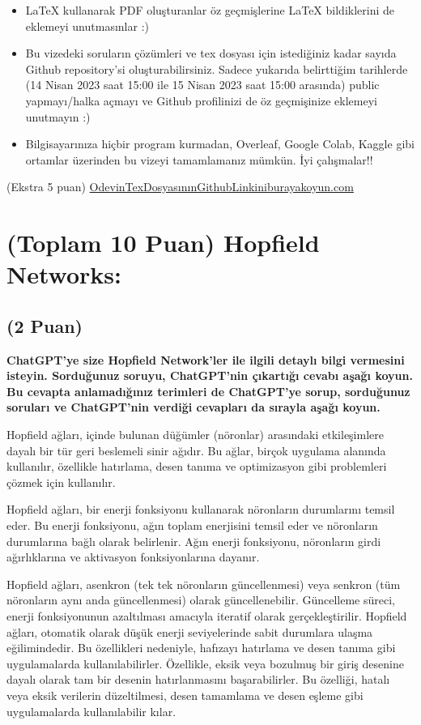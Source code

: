 \documentclass[11pt]{article}
\begin{document}
\begin{itemize}
    \item LaTeX kullanarak PDF oluşturanlar öz geçmişlerine LaTeX bildiklerini de eklemeyi unutmasınlar :)
    \item Bu vizedeki soruların çözümleri ve tex dosyası için istediğiniz kadar sayıda Github repository'si oluşturabilirsiniz. Sadece yukarıda belirttiğim tarihlerde (14 Nisan 2023 saat 15:00 ile 15 Nisan 2023 saat 15:00 arasında) public yapmayı/halka açmayı ve Github profilinizi de öz geçmişinize eklemeyi unutmayın :)
    \item Bilgisayarınıza hiçbir program kurmadan, Overleaf, Google Colab, Kaggle gibi ortamlar üzerinden bu vizeyi tamamlamanız mümkün. İyi çalışmalar!!
\end{itemize}

(Ekstra 5 puan) \url{OdevinTexDosyasınınGithubLinkiniburayakoyun.com}

\newpage
\section{(Toplam 10 Puan) Hopfield Networks:}

\subsection{(2 Puan)} \textbf{ChatGPT’ye size Hopfield Network’ler ile ilgili detaylı bilgi vermesini isteyin. Sorduğunuz soruyu, ChatGPT'nin çıkartığı cevabı aşağı koyun. Bu cevapta anlamadığınız terimleri de ChatGPT’ye sorup, sorduğunuz soruları ve ChatGPT’nin verdiği cevapları da sırayla aşağı koyun.}

    Hopfield ağları, içinde bulunan düğümler (nöronlar) arasındaki etkileşimlere dayalı bir tür geri beslemeli sinir ağıdır. Bu ağlar, birçok uygulama alanında kullanılır, özellikle hatırlama, desen tanıma ve optimizasyon gibi problemleri çözmek için kullanılır.
    
    Hopfield ağları, bir enerji fonksiyonu kullanarak nöronların durumlarını temsil eder. Bu enerji fonksiyonu, ağın toplam enerjisini temsil eder ve nöronların durumlarına bağlı olarak belirlenir. Ağın enerji fonksiyonu, nöronların girdi ağırlıklarına ve aktivasyon fonksiyonlarına dayanır.
    
    Hopfield ağları, asenkron (tek tek nöronların güncellenmesi) veya senkron (tüm nöronların aynı anda güncellenmesi) olarak güncellenebilir. Güncelleme süreci, enerji fonksiyonunun azaltılması amacıyla iteratif olarak gerçekleştirilir.
    Hopfield ağları, otomatik olarak düşük enerji seviyelerinde sabit durumlara ulaşma eğilimindedir. Bu özellikleri nedeniyle, hafızayı hatırlama ve desen tanıma gibi uygulamalarda kullanılabilirler. Özellikle, eksik veya bozulmuş bir giriş desenine dayalı olarak tam bir desenin hatırlanmasını başarabilirler. Bu özelliği, hatalı veya eksik verilerin düzeltilmesi, desen tamamlama ve desen eşleme gibi uygulamalarda kullanılabilir kılar.
    
\end{document}
